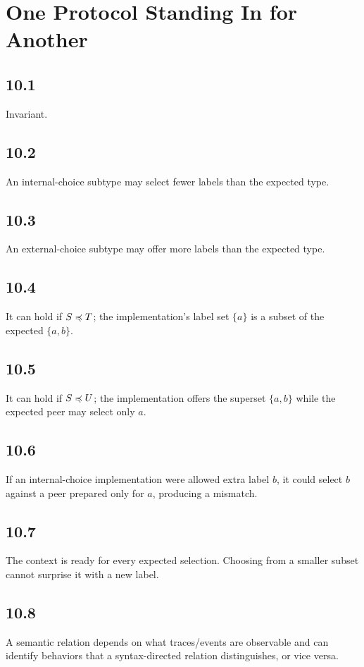\chapter{One Protocol Standing In for Another}

\section*{10.1}
Invariant.

\section*{10.2}
An internal-choice subtype may select fewer labels than the expected type.

\section*{10.3}
An external-choice subtype may offer more labels than the expected type.

\section*{10.4}
It can hold if $S\preccurlyeq T$; the implementation's label set $\{a\}$ is a subset of the expected $\{a,b\}$.

\section*{10.5}
It can hold if $S\preccurlyeq U$; the implementation offers the superset $\{a,b\}$ while the expected peer may select only $a$.

\section*{10.6}
If an internal-choice implementation were allowed extra label $b$, it could select $b$ against a peer prepared only for $a$, producing a mismatch.

\section*{10.7}
The context is ready for every expected selection. Choosing from a smaller subset cannot surprise it with a new label.

\section*{10.8}
A semantic relation depends on what traces/events are observable and can identify behaviors that a syntax-directed relation distinguishes, or vice versa.

